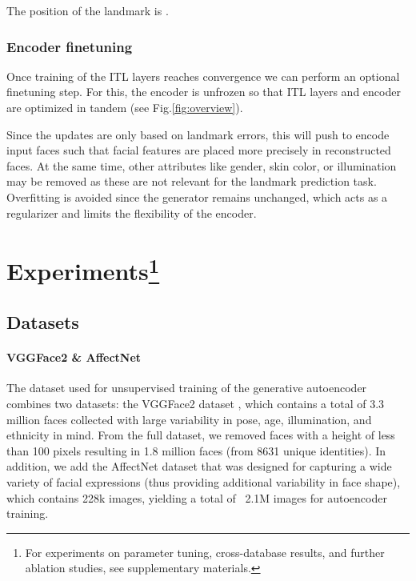 \documentclass[10pt,twocolumn,letterpaper]{article}
\begin{document}
\vspace{-0.1cm}

The position of the landmark is .

\vspace{-0.5cm}\subsubsection{Encoder finetuning}\vspace{-0.1cm} 
Once training of the ITL layers reaches convergence we can perform an optional finetuning step. For this, the encoder  is unfrozen so that ITL layers and encoder are optimized in tandem (see Fig.\ref{fig:overview}).
\vspace{-0.1cm}

Since the updates are only based on landmark errors, this will push  to encode input faces such that facial features are placed more precisely in reconstructed faces. At the same time, other attributes like gender, skin color, or illumination may be removed as these are not relevant for the landmark prediction task. Overfitting is avoided since the generator remains unchanged, which acts as a regularizer and limits the flexibility of the encoder. 


\vspace{-0.1cm}

\section{Experiments\protect\footnote{For experiments on parameter tuning, cross-database results, and further ablation studies, see supplementary materials.}}

\vspace{-0.1cm}\subsection{Datasets}\vspace{-0.1cm}

\paragraph{VGGFace2 \& AffectNet} The dataset used for unsupervised training of the generative autoencoder combines two datasets: the VGGFace2 dataset \cite{cao2018vggface2}, which contains a total of 3.3 million faces collected with large variability in pose, age, illumination, and ethnicity in mind. From the full dataset, we removed faces with a height of less than 100 pixels resulting in 1.8 million faces (from 8631 unique identities). In addition, we add the AffectNet dataset \cite{Mollahosseini2017} that was designed for capturing a wide variety of facial expressions (thus providing additional variability in face shape), which contains 228k images, yielding a total of ~2.1M images for autoencoder training.
\end{document}
